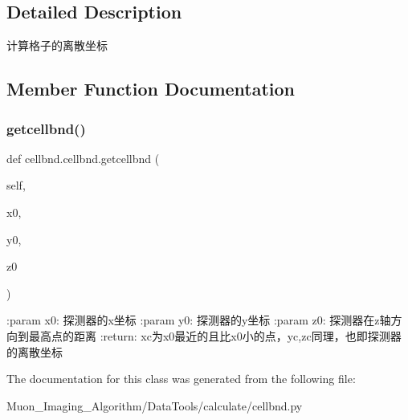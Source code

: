 \subsection{Detailed Description}
\begin{DoxyVerb}计算格子的离散坐标\end{DoxyVerb}
 

\subsection{Member Function Documentation}
\mbox{\label{classcellbnd_1_1cellbnd_a0954f88f9f231b47290dd86cc38b878a}} 
\subsubsection{\texorpdfstring{getcellbnd()}{getcellbnd()}}
{\footnotesize\ttfamily def cellbnd.\+cellbnd.\+getcellbnd (\begin{DoxyParamCaption}\item[{}]{self,  }\item[{}]{x0,  }\item[{}]{y0,  }\item[{}]{z0 }\end{DoxyParamCaption})}

\begin{DoxyVerb}:param x0: 探测器的x坐标
:param y0: 探测器的y坐标
:param z0: 探测器在z轴方向到最高点的距离
:return: xc为x0最近的且比x0小的点，yc,zc同理，也即探测器的离散坐标
\end{DoxyVerb}
 

The documentation for this class was generated from the following file\+:\begin{DoxyCompactItemize}
\item 
Muon\+\_\+\+Imaging\+\_\+\+Algorithm/\+Data\+Tools/calculate/cellbnd.\+py\end{DoxyCompactItemize}

